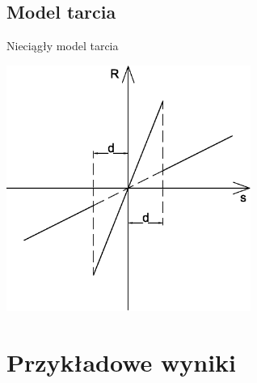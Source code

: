 \documentclass{beamer}
\begin{document}
\subsection{Model tarcia}
\begin{frame}{Nieciągły model tarcia}
\begin{center}
\includegraphics[width=0.6\textwidth]{img/discont.eps}
\end{center}
\end{frame}

\section{Przykładowe wyniki}
\end{document}
